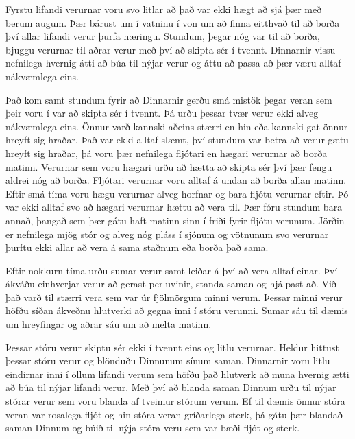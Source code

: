 \documentclass[ebook,11pt,oneside,openany]{memoir}
\begin{document}
\bigskip

Fyrstu lifandi verurnar voru svo litlar að það var ekki hægt að sjá þær með berum augum. Þær bárust um í vatninu í von um að finna eitthvað til að borða því allar lifandi verur þurfa næringu. Stundum, þegar nóg var til að borða, bjuggu verurnar til aðrar verur með því að skipta sér í tvennt. Dinnarnir vissu nefnilega hvernig átti að búa til nýjar verur og áttu að passa að þær væru alltaf nákvæmlega eins.

Það kom samt stundum fyrir að Dinnarnir gerðu smá mistök þegar veran sem þeir voru í var að skipta sér í tvennt. Þá urðu þessar tvær verur ekki alveg nákvæmlega eins. Önnur varð kannski aðeins stærri en hin eða kannski gat önnur hreyft sig hraðar. Það var ekki alltaf slæmt, því stundum var betra að verur gætu hreyft sig hraðar, þá voru þær nefnilega fljótari en hægari verurnar að borða matinn. Verurnar sem voru hægari urðu að hætta að skipta sér því þær fengu aldrei nóg að borða. Fljótari verurnar voru alltaf á undan að borða allan matinn. Eftir smá tíma voru hægu verurnar alveg horfnar og bara fljótu verurnar eftir. Þó var ekki alltaf svo að hægari verurnar hættu að vera til. Þær fóru stundum bara annað, þangað sem þær gátu haft matinn sinn í friði fyrir fljótu verunum. Jörðin er nefnilega mjög stór og alveg nóg pláss í sjónum og vötnunum svo verurnar þurftu ekki allar að vera á sama staðnum eða borða það sama.

Eftir nokkurn tíma urðu sumar verur samt leiðar á því að vera alltaf einar. Því ákváðu einhverjar verur að gerast perluvinir, standa saman og hjálpast að. Við það varð til stærri vera sem var úr fjölmörgum minni verum. Þessar minni verur höfðu síðan ákveðnu hlutverki að gegna inni í stóru verunni. Sumar sáu til dæmis um hreyfingar og aðrar sáu um að melta matinn.

Þessar stóru verur skiptu sér ekki í tvennt eins og litlu verurnar. Heldur hittust þessar stóru verur og blönduðu Dinnunum sínum saman. Dinnarnir voru litlu eindirnar inni í öllum lifandi verum sem höfðu það hlutverk að muna hvernig ætti að búa til nýjar lifandi verur. Með því að blanda saman Dinnum urðu til nýjar stórar verur sem voru blanda af tveimur stórum verum. Ef til dæmis önnur stóra veran var rosalega fljót og hin stóra veran gríðarlega sterk, þá gátu þær blandað saman Dinnum og búið til nýja stóra veru sem var bæði fljót og sterk.
\end{document}
